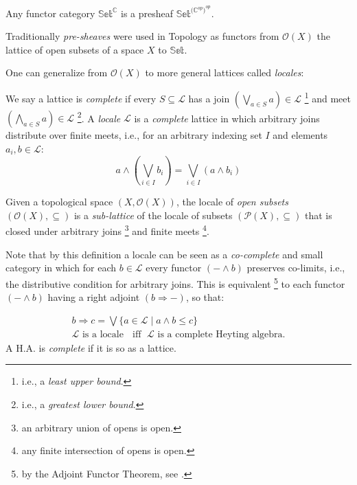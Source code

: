 \begin{lem}
	Any functor category $\mathbb{Set}^\mathbb{C}$ is a presheaf $\mathbb{Set}^{({\mathbb{C}^{op})}^{op}}$. 
\end{lem}

 Traditionally \emph{pre-sheaves} were used in Topology as functors from $\mathcal{O}(X)$ the lattice of open subsets of a space $X$ to $\mathbb{Set}$. \newline
  
 One can generalize from $\mathcal{O}(X)$ to more general lattices called \emph{locales}:

 
 \begin{definition}[Locale]
 		We say a lattice is \emph{complete} if every $S \subseteq \mathcal{L}$ has a join $(\bigvee_{a \in S} a) \in \mathcal{L}$ \footnote{i.e., a \emph{least upper bound}.} and meet $(\bigwedge_{a \in S} a) \in \mathcal{L}$ \footnote{i.e., a \emph{greatest lower bound}.}.   \newline
 	A \emph{locale} $\mathcal{L}$ is a \emph{complete} lattice in which arbitrary joins distribute over finite meets, i.e., for an arbitrary indexing set $I$ and elements $a_i,b \in \mathcal{L}$:
 	\begin{equation*}
 		a \land (\bigvee_{i \in I} b_i ) = \bigvee_{i \in I} (a \land b_i)
 	\end{equation*}
 \end{definition}
 
 \begin{ex}
 	Given a topological space $(X,\mathcal{O}(X))$, the locale of \emph{open subsets} $(\mathcal{O}(X),\subseteq)$ is a \emph{sub-lattice} of the locale of subsets $(\mathcal{P}(X), \subseteq)$ that is closed under arbitrary joins \footnote{an arbitrary union of opens is open.} and finite meets \footnote{any finite intersection of opens is open.}. 
 \end{ex}

 Note that by this definition a locale can be seen as a \emph{co-complete} and small category in which for each $b\in \mathcal{L}$ every functor $(- \land b)$ preserves co-limits, i.e., the distributive condition for arbitrary joins.
 This is equivalent \footnote{by the Adjoint Functor Theorem, see \cite{awodey}.} to each functor $(- \land b)$ having a right adjoint $(b \Rightarrow -)$, so that:
 \begin{prop}
 	\begin{gather*}
 		 b \Rightarrow c = \bigvee \{a \in \mathcal{L} \;|\; a \land b \leq c\} \\
 		\mathcal{L}\text{ is a locale } \;\text{ iff } \; \mathcal{L} \text{ is a complete Heyting algebra}. 
 	\end{gather*}
 	A H.A. is \emph{complete} if it is so as a lattice.
 \end{prop} 
 
